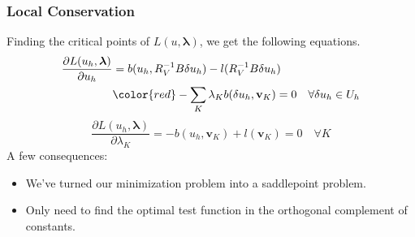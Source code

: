 \documentclass[mathserif]{beamer}
\def\blambda{\boldsymbol\lambda}
\begin{document}
\begin{frame}
\frametitle{Local Conservation}
Finding the critical points of $L(u,\blambda)$, we get the following
equations.
\begin{align*}
\frac{\partial L(u_h,\blambda)}{\partial u_h}&=b(u_h,R_V^{-1}B\delta u_h)
-l(R_V^{-1}B\delta u_h)\\
&{\color{red}-\sum_K\lambda_K b(\delta
u_h,\mathbf{v}_K)}=0\quad\forall\delta u_h\in U_h
\end{align*}
\[
\frac{\partial
L(u_h,\blambda)}{\partial\lambda_K}=-b(u_h,\mathbf{v}_K)+l(\mathbf{v}_K)=0\quad\forall
K
\]
A few consequences:
\begin{itemize}
\item We've turned our minimization problem into a saddlepoint problem.
\item Only need to find the optimal test function in the orthogonal complement
of constants. %
\end{itemize}
\end{frame}

\end{document}
